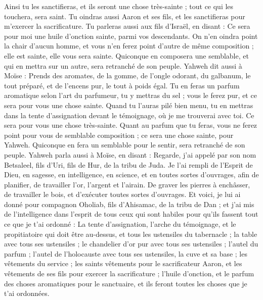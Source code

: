 \begin{multicols}{2}
Ainsi tu les sanctifieras, et ils seront une chose très-sainte ; tout ce qui les touchera, sera saint.
Tu oindras aussi Aaron et ses fils, et les sanctifieras pour m'exercer la sacrificature.
Tu parleras aussi aux fils d'Israël, en disant : Ce sera pour moi une huile d’onction sainte, parmi vos descendants.
On n'en oindra point la chair d'aucun homme, et vous n'en ferez point d'autre de même composition ; elle est sainte, elle vous sera sainte.
Quiconque en composera une semblable, et qui en mettra sur un autre, sera retranché de son peuple.
Yahweh dit aussi à Moïse : Prends des aromates, de la gomme, de l’ongle odorant, du galbanum, le tout préparé, et de l'encens pur, le tout à poids égal.
Tu en feras un parfum aromatique selon l'art du parfumeur, tu y mettras du sel ; vous le ferez pur, et ce sera pour vous une chose sainte.
Quand tu l'auras pilé bien menu, tu en mettras dans la tente d'assignation devant le témoignage, où je me trouverai avec toi. Ce sera pour vous une chose très-sainte.
Quant au parfum que tu feras, vous ne ferez point pour vous de semblable composition ; ce sera une chose sainte, pour Yahweh.
Quiconque en fera un semblable pour le sentir, sera retranché de son peuple.
\VerseOne{}Yahweh parla aussi à Moïse, en disant :
Regarde, j'ai appelé par son nom Betsaleel, fils d'Uri, fils de Hur, de la tribu de Juda.
Je l'ai rempli de l'Esprit de Dieu, en sagesse, en intelligence, en science, et en toutes sortes d'ouvrages,
afin de planifier, de travailler l’or, l’argent et l’airain.
De graver les pierres à enchâsser, de travailler le bois, et d’exécuter toutes sortes d’ouvrages.
Et voici, je lui ai donné pour compagnon Oholiab, fils d'Ahisamac, de la tribu de Dan ; et j'ai mis de l’intelligence dans l’esprit de tous ceux qui sont habiles pour qu'ils fassent tout ce que je t’ai ordonné :
La tente d'assignation, l'arche du témoignage, et le propitiatoire qui doit être au-dessus, et tous les ustensiles du tabernacle ;
la table avec tous ses ustensiles ; le chandelier d’or pur avec tous ses ustensiles ; l'autel du parfum ;
l'autel de l'holocauste avec tous ses ustensiles, la cuve et sa base ;
les vêtements du service ; les saints vêtements pour le sacrificateur Aaron, et les vêtements de ses fils pour exercer la sacrificature ;
l'huile d'onction, et le parfum des choses aromatiques pour le sanctuaire, et ils feront toutes les choses que je t'ai ordonnées.

\end{multicols}
